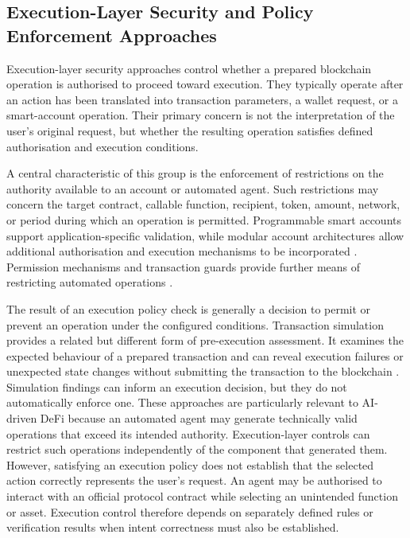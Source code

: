 \subsection{Execution-Layer Security and Policy Enforcement Approaches}
\label{subsec:execution_layer_security}

Execution-layer security approaches control whether a prepared
blockchain operation is authorised to proceed toward execution.
They typically operate after an action has been translated into
transaction parameters, a wallet request, or a smart-account
operation. Their primary concern is not the interpretation of
the user's original request, but whether the resulting operation
satisfies defined authorisation and execution conditions.

A central characteristic of this group is the enforcement of
restrictions on the authority available to an account or
automated agent. Such restrictions may concern the target
contract, callable function, recipient, token, amount, network,
or period during which an operation is permitted. Programmable
smart accounts support application-specific validation, while
modular account architectures allow additional authorisation
and execution mechanisms to be incorporated
\cite{buterinERC4337AccountAbstraction2021,
erc7579MinimalModularSmartAccounts2023}.
Permission mechanisms and transaction guards provide further
means of restricting automated operations
\cite{zeroDevPermissionsSessionKeys2026,
safeSmartAccountGuards2026}.

The result of an execution policy check is generally a decision
to permit or prevent an operation under the configured
conditions. Transaction simulation provides a related but
different form of pre-execution assessment. It examines the
expected behaviour of a prepared transaction and can reveal
execution failures or unexpected state changes without
submitting the transaction to the blockchain
\cite{tenderlyTransactionSimulation2026}. Simulation findings
can inform an execution decision, but they do not automatically
enforce one. These approaches are particularly relevant to AI-driven DeFi
because an automated agent may generate technically valid
operations that exceed its intended authority. Execution-layer
controls can restrict such operations independently of the
component that generated them. However, satisfying an execution
policy does not establish that the selected action correctly
represents the user's request. An agent may be authorised to
interact with an official protocol contract while selecting an
unintended function or asset. Execution control therefore
depends on separately defined rules or verification results
when intent correctness must also be established.

